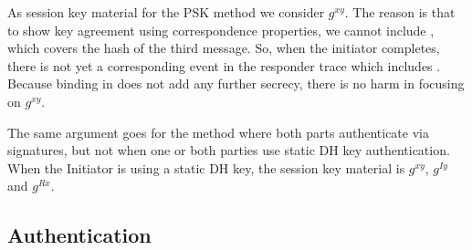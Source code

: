As session key material for the PSK method we consider $g^{xy}$.
%
The reason is that to show key agreement using correspondence properties, we
cannot include , which covers the hash of the third message.
%
So, when the initiator completes, there is not yet a corresponding event in
the responder trace which includes .
%
Because binding in  does not add any further secrecy, there
is no harm in focusing on $g^{xy}$.
%

The same argument goes for the method where both parts authenticate via
signatures, but not when one or both parties use static DH key authentication.
%
When the Initiator is using a static DH key, the session key material is
$g^{xy}$, $g^{Iy}$ and $g^{Rx}$.
%
%
\subsection{Authentication}
